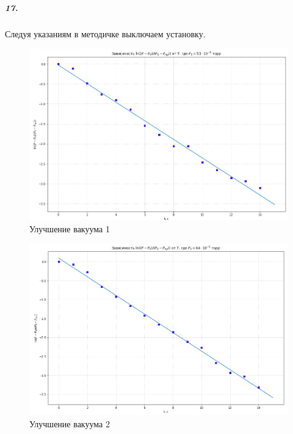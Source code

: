 \documentclass[a4paper,12pt]{article}
\begin{document}
\subparagraph*{17.} Следуя указаниям в методичке выключаем установку. 

\newpage


\begin{figure} [h!]
	\caption{Улучшение вакуума 1}
	\centering 
	\includegraphics[scale=0.4]{11.jpg} 
\end{figure}

\begin{figure} [h!]
	\caption{Улучшение вакуума 2}
	\centering 
	\includegraphics[scale=0.4]{22.jpg} 
\end{figure}


\newpage
\end{document}
